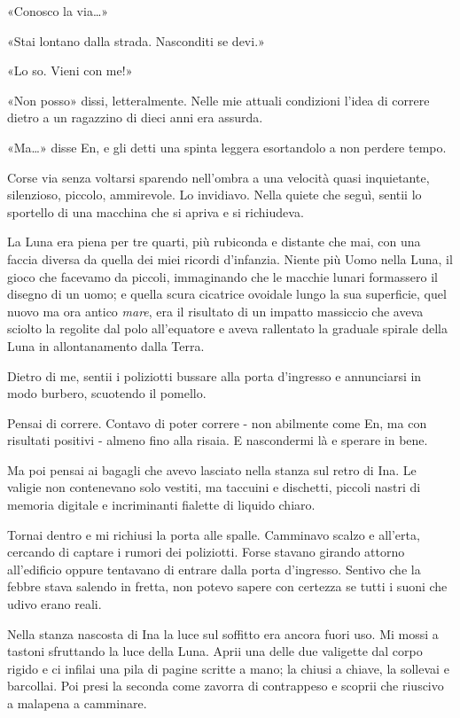 «Conosco la via\ldots»

«Stai lontano dalla strada. Nasconditi se devi.»

«Lo so. Vieni con me!»

«Non posso» dissi, letteralmente. Nelle mie attuali condizioni l'idea di
correre dietro a un ragazzino di dieci anni era assurda.

«Ma\ldots» disse En, e gli detti una spinta leggera esortandolo a non
perdere tempo.

Corse via senza voltarsi sparendo nell'ombra a una velocità quasi
inquietante, silenzioso, piccolo, ammirevole. Lo invidiavo. Nella quiete
che seguì, sentii lo sportello di una macchina che si apriva e si
richiudeva.

La Luna era piena per tre quarti, più rubiconda e distante che mai, con
una faccia diversa da quella dei miei ricordi d'infanzia. Niente più
Uomo nella Luna, il gioco che facevamo da piccoli, immaginando che le
macchie lunari formassero il disegno di un uomo; e quella scura
cicatrice ovoidale lungo la sua superficie, quel nuovo ma ora antico
\emph{mare}, era il risultato di un impatto massiccio che aveva sciolto
la regolite dal polo all'equatore e aveva rallentato la graduale spirale
della Luna in allontanamento dalla Terra.

Dietro di me, sentii i poliziotti bussare alla porta d'ingresso e
annunciarsi in modo burbero, scuotendo il pomello.

Pensai di correre. Contavo di poter correre - non abilmente come En, ma
con risultati positivi - almeno fino alla risaia. E nascondermi là e
sperare in bene.

Ma poi pensai ai bagagli che avevo lasciato nella stanza sul retro di
Ina. Le valigie non contenevano solo vestiti, ma taccuini e dischetti,
piccoli nastri di memoria digitale e incriminanti fialette di liquido
chiaro.

Tornai dentro e mi richiusi la porta alle spalle. Camminavo scalzo e
all'erta, cercando di captare i rumori dei poliziotti. Forse stavano
girando attorno all'edificio oppure tentavano di entrare dalla porta
d'ingresso. Sentivo che la febbre stava salendo in fretta, non potevo
sapere con certezza se tutti i suoni che udivo erano reali.

Nella stanza nascosta di Ina la luce sul soffitto era ancora fuori uso.
Mi mossi a tastoni sfruttando la luce della Luna. Aprii una delle due
valigette dal corpo rigido e ci infilai una pila di pagine scritte a
mano; la chiusi a chiave, la sollevai e barcollai. Poi presi la seconda
come zavorra di contrappeso e scoprii che riuscivo a malapena a
camminare.

